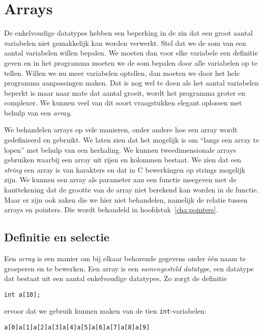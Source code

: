 \chapter{Arrays}
\label{cha:arrays}
\thispagestyle{empty}

De enkelvoudige datatypes hebben een beperking in de zin dat een groot aantal variabelen niet gemakkelijk kan worden verwerkt. Stel dat we de som van een aantal variabelen willen bepalen. We moeten dan voor elke variabele een definitie geven en in het programma moeten we de som bepalen door alle variabelen op te tellen. Willen we nu meer variabelen optellen, dan moeten we door het hele programma aanpassingen maken. Dat is nog wel te doen als het aantal variabelen beperkt is maar naar mate dat aantal groeit, wordt het programma groter en complexer. We kunnen veel van dit soort vraagstukken elegant oplossen met behulp van een \textsl{array}.

We behandelen arrays op vele manieren, onder andere hoe een array wordt gedefinieerd en gebruikt. We laten zien dat het mogelijk is om ``langs een array te lopen'' met behulp van een herhaling. We kunnen tweedimensionale arrays gebruiken waarbij een array uit rijen en kolommen bestaat. We zien dat een \textsl{string} een array is van karakters en dat in C bewerkingen op strings mogelijk zijn. We kunnen een array als parameter aan een functie meegeven met de kanttekening dat de grootte van de array niet berekend kan worden in de functie. Maar er zijn ook zaken die we hier niet behandelen, namelijk de relatie tussen arrays en pointers. Die wordt behandeld in hoofdstuk~\ref{cha:pointers}.

\section{Definitie en selectie}
Een \textsl{array} is een manier om bij elkaar behorende gegevens onder één naam te groeperen en te bewerken. Een array is een \textsl{samengesteld datatype}, een datatype dat bestaat uit een aantal enkelvoudige datatypes.
Zo zorgt de definitie

\hspace*{1em}\texttt{int a[10];}

ervoor dat we gebruik kunnen maken van de tien \texttt{int}-variabelen:

\hspace*{1em}\texttt{a[0]}\quad\texttt{a[1]}\quad\texttt{a[2]}\quad\texttt{a[3]}\quad\texttt{a[4]}\quad\texttt{a[5]}\quad\texttt{a[6]}\quad\texttt{a[7]}\quad\texttt{a[8]}\quad\texttt{a[9]}

